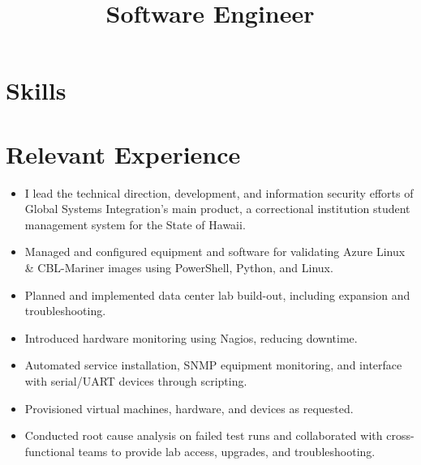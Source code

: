 \documentclass[11pt,sans]{moderncv}
\title{Software Engineer}
\begin{document}
\maketitle
\section{Skills}
\section{Relevant Experience}
\newline{}
\begin{itemize}
\item I lead the technical direction, development, and information security efforts of Global Systems Integration's main product, a correctional institution student management system for the State of Hawaii.
\newline{}
\end{itemize}
\newline{}
\begin{itemize}
\item Managed and configured equipment and software for validating Azure Linux \& CBL-Mariner images using PowerShell, Python, and Linux.
\item Planned and implemented data center lab build-out, including expansion and troubleshooting.
\item Introduced hardware monitoring using Nagios, reducing downtime.
\item Automated service installation, SNMP equipment monitoring, and interface with serial/UART devices through scripting.
\item Provisioned virtual machines, hardware, and devices as requested.
\item Conducted root cause analysis on failed test runs and collaborated with cross-functional teams to provide lab access, upgrades, and troubleshooting.\newline{}
\end{itemize}
\end{document}

